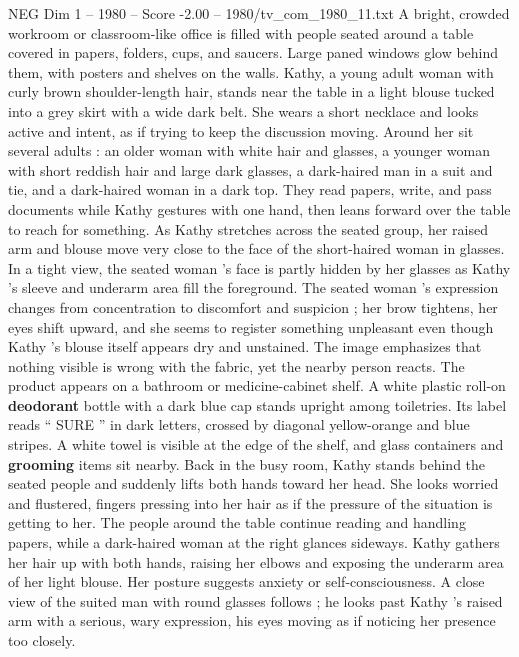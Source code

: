 \begin{textsample}{NEG Dim 1 – 1980 – Score -2.00 – 1980/tv\_com\_1980\_11.txt}  \label{ex:f1_neg_046}
A bright, crowded workroom or classroom-like office is filled with people seated around a table covered in papers, folders, cups, and saucers.
Large paned windows glow behind them, with posters and shelves on the walls.
Kathy, a young adult woman with curly brown shoulder-length hair, stands near the table in a light blouse tucked into a grey skirt with a wide dark belt.
She wears a short necklace and looks active and intent, as if trying to keep the discussion moving.
Around her sit several adults : an older woman with white hair and glasses, a younger woman with short reddish hair and large dark glasses, a dark-haired man in a suit and tie, and a dark-haired woman in a dark top.
They read papers, write, and pass documents while Kathy gestures with one hand, then leans forward over the table to reach for something.
As Kathy stretches across the seated group, her raised arm and blouse move very close to the face of the short-haired woman in glasses.
In a tight view, the seated woman ’s face is partly hidden by her glasses as Kathy ’s sleeve and underarm area fill the foreground.
The seated woman ’s expression changes from concentration to discomfort and suspicion ; her brow tightens, her eyes shift upward, and she seems to register something unpleasant even though Kathy ’s blouse itself appears dry and unstained.
The image emphasizes that nothing visible is wrong with the fabric, yet the nearby person reacts.
The product appears on a bathroom or medicine-cabinet shelf.
A white plastic roll-on \textbf{deodorant} bottle with a dark blue cap stands upright among toiletries.
Its label reads “ SURE ” in dark letters, crossed by diagonal yellow-orange and blue stripes.
A white towel is visible at the edge of the shelf, and glass containers and \textbf{grooming} items sit nearby.
Back in the busy room, Kathy stands behind the seated people and suddenly lifts both hands toward her head.
She looks worried and flustered, fingers pressing into her hair as if the pressure of the situation is getting to her.
The people around the table continue reading and handling papers, while a dark-haired woman at the right glances sideways.
Kathy gathers her hair up with both hands, raising her elbows and exposing the underarm area of her light blouse.
Her posture suggests anxiety or self-consciousness.
A close view of the suited man with round glasses follows ; he looks past Kathy ’s raised arm with a serious, wary expression, his eyes moving as if noticing her presence too closely.

\end{textsample}
